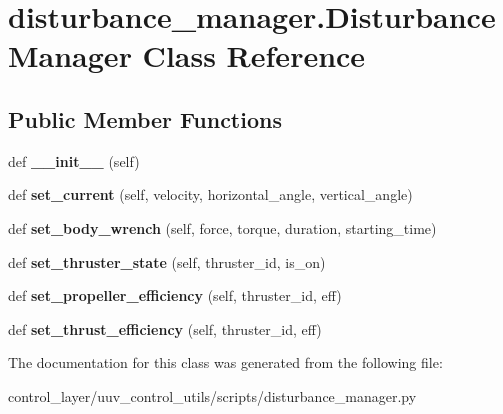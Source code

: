 \hypertarget{classdisturbance__manager_1_1DisturbanceManager}{}\section{disturbance\+\_\+manager.\+Disturbance\+Manager Class Reference}
\label{classdisturbance__manager_1_1DisturbanceManager}
\subsection*{Public Member Functions}
\begin{DoxyCompactItemize}
\item 
\mbox{\label{classdisturbance__manager_1_1DisturbanceManager_a0a5fb846386cbfd860c433826635ff7f}} 
def {\bfseries \+\_\+\+\_\+init\+\_\+\+\_\+} (self)
\item 
\mbox{\label{classdisturbance__manager_1_1DisturbanceManager_a15ae6c934d37756579f397bbed789927}} 
def {\bfseries set\+\_\+current} (self, velocity, horizontal\+\_\+angle, vertical\+\_\+angle)
\item 
\mbox{\label{classdisturbance__manager_1_1DisturbanceManager_ae7e8a162ed42d8fa1835e6585cf27d4a}} 
def {\bfseries set\+\_\+body\+\_\+wrench} (self, force, torque, duration, starting\+\_\+time)
\item 
\mbox{\label{classdisturbance__manager_1_1DisturbanceManager_a3cfab35f2cfb1464c67baf6ac105c569}} 
def {\bfseries set\+\_\+thruster\+\_\+state} (self, thruster\+\_\+id, is\+\_\+on)
\item 
\mbox{\label{classdisturbance__manager_1_1DisturbanceManager_ad92f7bd8ecfb5b1e7db1bff8d040ae09}} 
def {\bfseries set\+\_\+propeller\+\_\+efficiency} (self, thruster\+\_\+id, eff)
\item 
\mbox{\label{classdisturbance__manager_1_1DisturbanceManager_a243a781bba7506bfc754c3890511a910}} 
def {\bfseries set\+\_\+thrust\+\_\+efficiency} (self, thruster\+\_\+id, eff)
\end{DoxyCompactItemize}


The documentation for this class was generated from the following file\+:\begin{DoxyCompactItemize}
\item 
control\+\_\+layer/uuv\+\_\+control\+\_\+utils/scripts/disturbance\+\_\+manager.\+py\end{DoxyCompactItemize}
